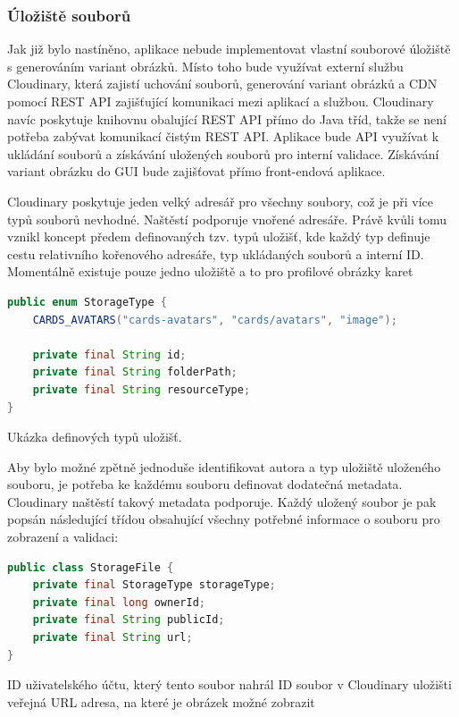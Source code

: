 		\subsubsection{Úložiště souborů}

		Jak již bylo nastíněno, aplikace nebude implementovat vlastní souborové úložiště s generováním variant obrázků.
		Místo toho bude využívat externí službu Cloudinary, která zajistí uchování souborů, generování variant obrázků
		a \ac{CDN} pomocí \ac{REST} \ac{API} zajišťující komunikaci mezi aplikací a službou.
		Cloudinary navíc poskytuje knihovnu obalující \ac{REST} \ac{API} přímo do Java tříd, takže se není potřeba zabývat
		komunikací čistým \ac{REST} \ac{API}.
		Aplikace bude \ac{API} využívat k ukládání souborů a získávání uložených souborů pro interní validace.
		Získávání variant obrázku do \ac{GUI} bude zajišťovat přímo front-endová aplikace.

		Cloudinary poskytuje jeden velký adresář pro všechny soubory, což je při více typů souborů nevhodné.
		Naštěstí podporuje vnořené adresáře.
		Právě kvůli tomu vznikl koncept předem definovaných tzv. typů uložišť, kde každý typ definuje cestu
		relativního kořenového adresáře, typ ukládaných souborů a interní ID.
		Momentálně existuje pouze jedno uložiště a to pro profilové obrázky karet

		\begin{lstlisting}[language=Java]
public enum StorageType {
    CARDS_AVATARS("cards-avatars", "cards/avatars", "image");

    private final String id;
    private final String folderPath;
    private final String resourceType;
}
		\end{lstlisting}
		Ukázka definových typů uložišť. %

		Aby bylo možné zpětně jednoduše identifikovat autora a typ uložiště uloženého souboru, je potřeba ke každému
		souboru definovat dodatečná metadata.
		Cloudinary naštěstí takový metadata podporuje.
		Každý uložený soubor je pak popsán následující třídou obsahující všechny potřebné informace o souboru pro zobrazení
		a validaci:

		\begin{lstlisting}[language=Java]
public class StorageFile {
    private final StorageType storageType;
    private final long ownerId;
    private final String publicId;
    private final String url;
}
		\end{lstlisting}

		ID uživatelského účtu, který tento soubor nahrál
		ID soubor v Cloudinary uložišti
		veřejná URL adresa, na které je obrázek možné zobrazit

